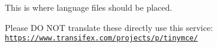 This is where language files should be placed.

Please DO N\+OT translate these directly use this service\+: \href{https://www.transifex.com/projects/p/tinymce/}{\tt https\+://www.\+transifex.\+com/projects/p/tinymce/} 